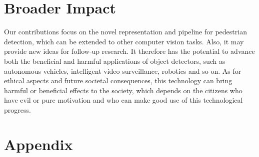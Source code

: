 \documentclass{article}
\begin{document}
\section*{Broader Impact}
Our contributions focus on the novel representation and pipeline for pedestrian detection, which can be extended to other computer vision tasks.
Also, it may provide new ideas for follow-up research.
It therefore has the potential to advance both the beneficial and harmful applications of object detectors, such as autonomous vehicles, intelligent video surveillance, robotics and so on.
As for ethical aspects and future societal consequences, this technology can bring harmful or beneficial effects to the society, which depends on the citizens who have evil or pure motivation and who can make good use of this technological progress. 


\section{Appendix}
\end{document}
